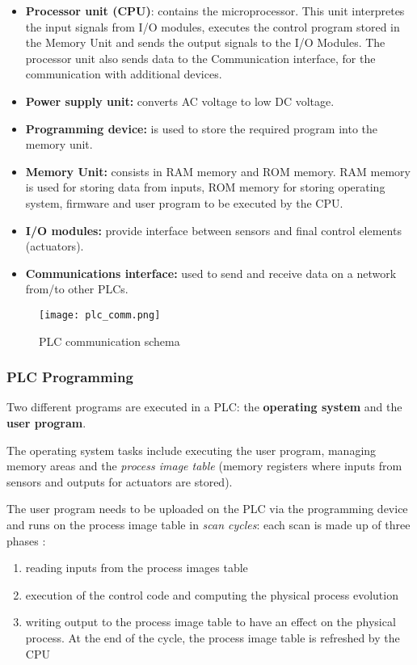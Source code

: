\begin{itemize}
	\item \textbf{Processor unit (CPU)}: contains the microprocessor. This unit interpretes the input signals from I/O modules, executes the control program stored in the Memory Unit and sends the output signals to the I/O Modules.
	The processor unit also sends data to the Communication interface, for the communication with additional devices.
	\item \textbf{Power supply unit:} converts AC voltage to low DC voltage.
	\item \textbf{Programming device:} is used to store the required program into the memory unit.
	\item \textbf{Memory Unit:} consists in RAM memory and ROM memory. RAM memory is used for storing data from inputs, ROM memory for storing operating system, firmware and user program to be executed by the CPU.
	\item \textbf{I/O modules:} provide interface between sensors and final control elements (actuators).
	\item \textbf{Communications interface:} used to send and receive data on a network from/to other PLCs.
\end{itemize}

\begin{figure}[ht]
	\centering
	\texttt{[image: plc\_comm.png]}
	\caption{PLC communication schema}
	\label{fig:PLC_comm}
\end{figure}

\subsubsection{PLC Programming}
\label{subsubsec:plc_programming}
Two different programs are executed in a PLC: the \textbf{operating system} and the \textbf{user program}.

\bigskip
The operating system tasks include executing the user program, managing memory areas and the \textit{process image table} (memory registers where inputs from sensors and outputs for actuators are stored).

\bigskip
The user program needs to be uploaded on the PLC via the programming device and runs on the process image table in \textit{scan cycles}: each scan is made up of three phases \cite{ceccato}:

\begin{enumerate}
	\item reading inputs from the process images table
	\item execution of the control code and computing the physical process evolution
	\item writing output to the process image table to have an effect on the physical process. At the end of the cycle, the process image table is refreshed by the CPU
\end{enumerate}

